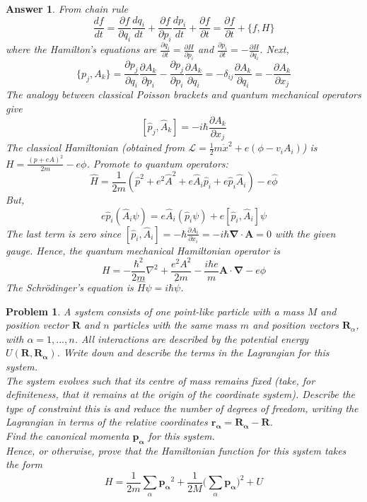 \documentclass[a4paper]{article}
\newtheorem{ans}{Answer}[section]
\theoremstyle{new}
\newtheorem{qns}{Problem}[section]
\begin{document}
\begin{ans}
From chain rule
$$\frac{df}{dt}=\frac{\partial f}{\partial q_i}\frac{dq_i}{dt}+\frac{\partial f}{\partial p_i}\frac{dp_i}{dt}+\frac{\partial f}{\partial t}=\frac{\partial f}{\partial t}+\{f,H\}$$
where the Hamilton's equations are $\frac{\partial q_i}{\partial t}=\frac{\partial H}{\partial p_i}$ and $\frac{\partial p_i}{\partial t}=-\frac{\partial H}{\partial q_i}$. Next,
$$\{p_j,A_k\}=\frac{\partial p_j}{\partial q_i}\frac{\partial A_k}{\partial p_i}-\frac{\partial p_j}{\partial p_i}\frac{\partial A_k}{\partial q_i}=-\delta_{ij}\frac{\partial A_k}{\partial q_i}=-\frac{\partial A_k}{\partial x_j}$$
The analogy between classical Poisson brackets and quantum mechanical operators give
$$[\hat{p}_j,\hat{A}_k]=-i\hbar\frac{\partial A_k}{\partial x_j}$$
The classical Hamiltonian (obtained from $\mathcal{L}=\frac{1}{2}m\dot{x}^2+e(\phi-v_iA_i)$) is $H=\frac{(p+eA)^2}{2m}-e\phi$. Promote to quantum operators:
$$\hat{H}=\frac{1}{2m}(\hat{p}^2+e^2\hat{A}^2+e\hat{A}_i\hat{p}_i+e\hat{p}_i\hat{A}_i)-e\hat{\phi}$$
But,
$$e\hat{p}_i(\hat{A}_i\psi)=e\hat{A}_i(\hat{p}_i\psi)+e[\hat{p}_i,\hat{A}_i]\psi$$
The last term is zero since $[\hat{p}_i,\hat{A}_i]=-\hbar\frac{\partial A_i}{\partial x_i}=-i\hbar\boldsymbol{\nabla}\cdot\mathbf{A}=0$ with the given gauge. Hence, the quantum mechanical Hamiltonian operator is
$$H=-\frac{\hbar^2}{2m}\nabla^2+\frac{e^2A^2}{2m}-\frac{i\hbar e}{m}\mathbf{A}\cdot\boldsymbol{\nabla}-e\phi$$
The Schr\"{o}dinger's equation is $\hat{H}\psi=i\hbar\dot{\psi}$.
\end{ans}
\begin{qns}
A system consists of one point-like particle with a mass $M$ and position vector $\mathbf{R}$ and $n$ particles with the same mass $m$ and position vectors $\mathbf{R}_\alpha$, with $\alpha= 1,..., n$. All interactions are described by the potential energy $U(\mathbf{R},\mathbf{R_\alpha})$. Write down and describe the terms in the Lagrangian for this system.\\[5pt]
The system evolves such that its centre of mass remains fixed (take, for definiteness, that it remains at the origin of the coordinate system). Describe the type of constraint this is and reduce the number of degrees of freedom, writing the Lagrangian in terms of the relative coordinates $\mathbf{r_\alpha}=\mathbf{R_\alpha}-\mathbf{R}$.\\[5pt]
Find the canonical momenta $\mathbf{p_\alpha}$ for this system.\\[5pt]
Hence, or otherwise, prove that the Hamiltonian function for this system takes the form
$$H=\frac{1}{2m}\sum_\alpha\mathbf{p_\alpha}^2+\frac{1}{2M}\bigg(\sum_\alpha\mathbf{p_\alpha}\bigg)^2+U$$
\end{qns}
\end{document}
